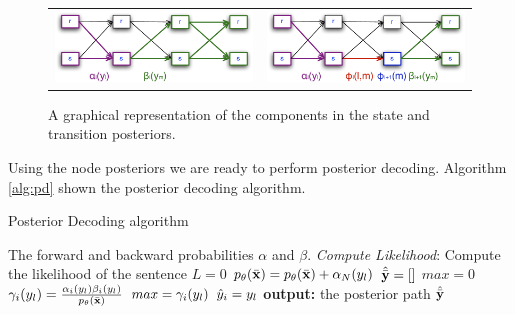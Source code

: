 \begin{figure}
\begin{center}
\begin{tabular}{cc}

\includegraphics[scale=.5]{figs/sequences/statePost}
& \includegraphics[scale=.5]{figs/sequences/transPost}\\
\end{tabular}
\caption[Posterior Illustration.]{\label{fig:posteriors} A graphical representation of the components in the state and transition posteriors.}

\end{center}
\end{figure}

Using the node posteriors we are ready to perform posterior
decoding. Algorithm \ref{alg:pd} shown the posterior decoding algorithm.

\begin{algorithm}[t]
   \caption{Posterior Decoding algorithm \label{alg:pd}}
\begin{algorithmic}[1]
    The forward and backward probabilities
       $\alpha$ and $\beta$.
   \STATE  \emph{Compute Likelihood}: Compute the likelihood of the
   sentence
   \STATE $L = 0$
   \STATE $p_{\theta}(\bar{\mathbf{x}}) = p_{\theta}(\bar{\mathbf{x}}) + \alpha_N({y}_l)$
   \ENDFOR 
   \STATE $\hat {\bar{\mathbf{y}}} = []$
    \STATE $max = 0$
     \STATE $\gamma_i({y}_l)  =  \frac{\alpha_i({y}_l)
       \beta_i({y}_l)}{p_{\theta}(\bar{\mathbf{x}})}$
     \STATE $max = \gamma_i({y}_l)$
     \STATE $\hat  y_i = {y}_l$
     \ENDIF
     \ENDFOR 
     \ENDFOR 
   \STATE \textbf{output:} the posterior path $\hat {\bar{\mathbf{y}}}$
\end{algorithmic}
\end{algorithm}



